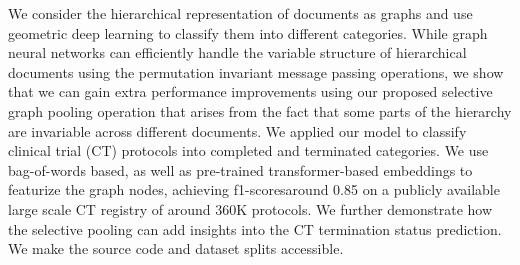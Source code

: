 We consider the hierarchical representation of documents as graphs and use geometric deep learning to classify them into different categories. While graph neural networks can efficiently handle the variable structure of hierarchical documents using the permutation invariant message passing operations, we show that we can gain extra performance improvements using our proposed selective graph pooling operation that arises from the fact that some parts of the hierarchy are invariable across different documents. We applied our model to classify clinical trial (CT) protocols into completed and terminated categories. We use bag-of-words based, as well as pre-trained transformer-based embeddings to featurize the graph nodes, achieving f1-scoresaround 0.85 on a publicly available large scale CT registry of around 360K protocols. We further demonstrate how the selective pooling can add insights into the CT termination status prediction. We make the source code and dataset splits accessible.
